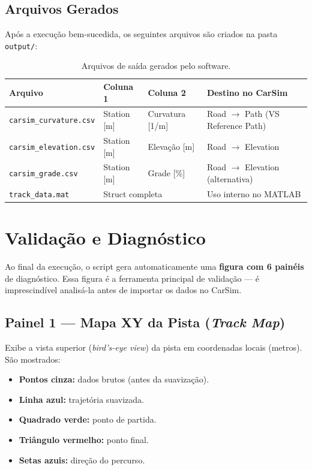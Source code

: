 \documentclass[a4paper,12pt]{article}
\begin{document}
\subsection{Arquivos Gerados}

Após a execução bem-sucedida, os seguintes arquivos são criados na pasta \texttt{output/}:

\begin{table}[H]
\centering
\caption{Arquivos de saída gerados pelo software.}
\label{tab:saida}
\begin{tabularx}{\textwidth}{lllX}
\toprule
\textbf{Arquivo} & \textbf{Coluna 1} & \textbf{Coluna 2} & \textbf{Destino no CarSim} \\
\midrule
\texttt{carsim\_curvature.csv} & Station [m] & Curvatura [1/m] & Road $\rightarrow$ Path (VS Reference Path) \\
\texttt{carsim\_elevation.csv} & Station [m] & Elevação [m] & Road $\rightarrow$ Elevation \\
\texttt{carsim\_grade.csv}     & Station [m] & Grade [\%]      & Road $\rightarrow$ Elevation (alternativa) \\
\texttt{track\_data.mat}       & \multicolumn{2}{l}{Struct completa} & Uso interno no MATLAB \\
\bottomrule
\end{tabularx}
\end{table}


\section{Validação e Diagnóstico}
\label{sec:diag}

Ao final da execução, o script gera automaticamente uma \textbf{figura com 6 painéis} de diagnóstico. Essa figura é a ferramenta principal de validação --- é imprescindível analisá-la antes de importar os dados no CarSim.

\subsection{Painel 1 --- Mapa XY da Pista (\textit{Track Map})}

Exibe a vista superior (\textit{bird's-eye view}) da pista em coordenadas locais (metros). São mostrados:

\begin{itemize}
    \item \textbf{Pontos cinza:} dados brutos (antes da suavização).
    \item \textbf{Linha azul:} trajetória suavizada.
    \item \textbf{Quadrado verde:} ponto de partida.
    \item \textbf{Triângulo vermelho:} ponto final.
    \item \textbf{Setas azuis:} direção do percurso.
\end{itemize}
\end{document}
